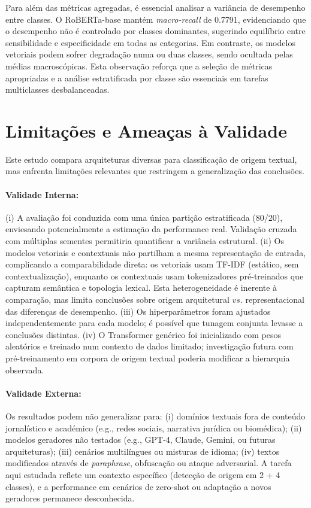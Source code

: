 \documentclass[runningheads]{llncs}
\begin{document}
Para além das métricas agregadas, é essencial analisar a variância de desempenho entre classes. O RoBERTa-base mantém \textit{macro-recall} de 0.7791, evidenciando que o desempenho não é controlado por classes dominantes, sugerindo equilíbrio entre sensibilidade e especificidade em todas as categorias. Em contraste, os modelos vetoriais podem sofrer degradação numa ou duas classes, sendo ocultada pelas médias macroscópicas. Esta observação reforça que a seleção de métricas apropriadas e a análise estratificada por classe são essenciais em tarefas multiclasses desbalanceadas.

\section{Limitações e Ameaças à Validade}

Este estudo compara arquiteturas diversas para classificação de origem textual, mas enfrenta limitações relevantes que restringem a generalização das conclusões.

\paragraph{Validade Interna:} (i) A avaliação foi conduzida com uma única partição estratificada (80/20), enviesando potencialmente a estimação da performance real. Validação cruzada com múltiplas sementes permitiria quantificar a variância estrutural. (ii) Os modelos vetoriais e contextuais não partilham a mesma representação de entrada, complicando a comparabilidade direta: os vetoriais usam TF-IDF (estático, sem contextualização), enquanto os contextuais usam tokenizadores pré-treinados que capturam semântica e topologia lexical. Esta heterogeneidade é inerente à comparação, mas limita conclusões sobre origem arquitetural $vs.$ representacional das diferenças de desempenho. (iii) Os hiperparâmetros foram ajustados independentemente para cada modelo; é possível que tunagem conjunta levasse a conclusões distintas. (iv) O Transformer genérico foi inicializado com pesos aleatórios e treinado num contexto de dados limitado; investigação futura com pré-treinamento em corpora de origem textual poderia modificar a hierarquia observada.

\paragraph{Validade Externa:} Os resultados podem não generalizar para: (i) domínios textuais fora de conteúdo jornalístico e académico (e.g., redes sociais, narrativa jurídica ou biomédica); (ii) modelos geradores não testados (e.g., GPT-4, Claude, Gemini, ou futuras arquiteturas); (iii) cenários multilíngues ou misturas de idioma; (iv) textos modificados através de \textit{paraphrase}, obfuscação ou ataque adversarial. A tarefa aqui estudada reflete um contexto específico (detecção de origem em 2 + 4 classes), e a performance em cenários de zero-shot ou adaptação a novos geradores permanece desconhecida.
\end{document}
